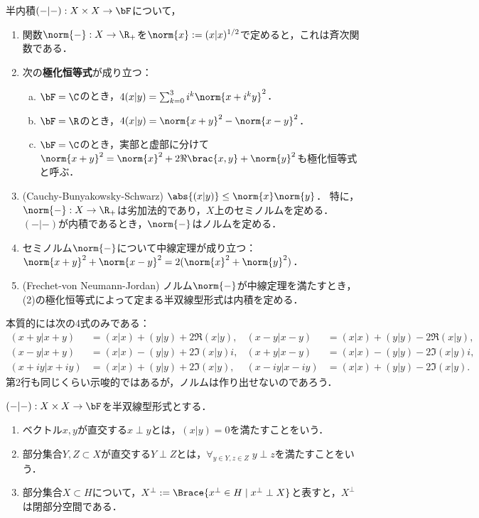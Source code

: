 \documentclass[uplatex,dvipdfmx]{jsreport}
\begin{document}
\begin{proposition}\label{prop-polarization-identity}
    半内積$(-|-):X\times X\to\bF$について，
    \begin{enumerate}
        \item 関数$\norm{-}:X\to\R_+$を$\norm{x}:=(x|x)^{1/2}$で定めると，これは斉次関数である．
        \item 次の\textbf{極化恒等式}が成り立つ：
        \begin{enumerate}[(a)]
            \item $\bF=\C$のとき，$4(x|y)=\sum^3_{k=0}i^k\norm{x+i^ky}^2$．
            \item $\bF=\R$のとき，$4(x|y)=\norm{x+y}^2-\norm{x-y}^2$．
            \item $\bF=\C$のとき，実部と虚部に分けて$\norm{x+y}^2=\norm{x}^2+2\Re\brac{x,y}+\norm{y}^2$も極化恒等式と呼ぶ．
        \end{enumerate}
        \item (Cauchy-Bunyakowsky-Schwarz) $\abs{(x|y)}\le\norm{x}\norm{y}$．
        特に，$\norm{-}:X\to\R_+$は劣加法的であり，$X$上のセミノルムを定める．
        $(-|-)$が内積であるとき，$\norm{-}$はノルムを定める．
        \item セミノルム$\norm{-}$について中線定理が成り立つ：$\norm{x+y}^2+\norm{x-y}^2=2(\norm{x}^2+\norm{y}^2)$．
        \item (Frechet-von Neumann-Jordan) ノルム$\norm{-}$が中線定理を満たすとき，(2)の極化恒等式によって定まる半双線型形式は内積を定める．
    \end{enumerate}
\end{proposition}
\begin{remarks}
    本質的には次の4式のみである：
    \begin{align*}
        (x+y|x+y)&=(x|x)+(y|y)+2\Re(x|y),&(x-y|x-y)&=(x|x)+(y|y)-2\Re(x|y),\\
        (x-y|x+y)&=(x|x)-(y|y)+2\Im(x|y)i,&(x+y|x-y)&=(x|x)-(y|y)-2\Im(x|y)i,\\
        (x+iy|x+iy)&=(x|x)+(y|y)+2\Im(x|y),&(x-iy|x-iy)&=(x|x)+(y|y)-2\Im(x|y).
    \end{align*}
    第2行も同じくらい示唆的ではあるが，ノルムは作り出せないのであろう．
\end{remarks}

\begin{definition}[orthogonal]
    $(-|-):X\times X\to\bF$を半双線型形式とする．
    \begin{enumerate}
        \item ベクトル$x,y$が直交する$x\perp y$とは，$(x|y)=0$を満たすことをいう．
        \item 部分集合$Y,Z\subset X$が直交する$Y\perp Z$とは，$\forall_{y\in Y,z\in Z}\;y\perp z$を満たすことをいう．
        \item 部分集合$X\subset H$について，$X^\perp:=\Brace{x^\perp\in H\mid x^\perp\perp X}$と表すと，$X^\perp$は閉部分空間である．
    \end{enumerate}
\end{definition}
\end{document}
